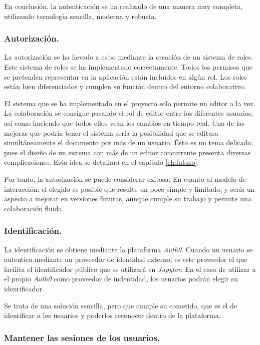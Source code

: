 \documentclass[11pt,spanish,listoffigures]{tfgetsinf}
\begin{document}
En conclusión, la autenticación se ha realizado de una manera muy completa, utilizando tecnología sencilla, moderna y robusta.

\subsubsection{Autorización.}

La autorización se ha llevado a cabo mediante la creación de un sistema de roles. Este sistema de roles se ha implementado correctamente. Todos los permisos que se pretenden representar en la aplicación están incluídos en algún rol. Los roles están bien diferenciados y cumplen su función dentro del entorno colaborativo. 

El sistema que se ha implementado en el proyecto solo permite un editor a la vez. La colaboración se consigue pasando el rol de editor entre los diferentes usuarios, así como haciendo que todos ellos vean los cambios en tiempo real. Una de las mejoras que podría tener el sistema sería la posibilidad que se editara simultáneamente el documento por más de un usuario. Ésto es un tema delicado, pues el diseño de un sistema con más de un editor concurrente presenta diversas complicaciones. Esta idea se detallará en el capítulo \ref{ch:futuro}.

Por tanto, la autorización se puede considerar exitosa. En cuanto al modelo de interacción, el elegido es posible que resulte un poco simple y limitado, y sería un aspecto a mejorar en versiones futuras, aunque cumple su trabajo y permite una colaboración fluida. 

\subsubsection{Identificación.}

La identificación se obtiene mediante la plataforma \textit{Auth0}. Cuando un usuario se autentica mediante un proveedor de identidad externo, es este proveedor el que facilita el identificador público que se utilizará en \textit{Jupyter}. En el caso de utilizar a el propio \textit{Auth0} como proveedor de indentidad, los usuarios podrán elegir su identificador. 

Se trata de una solución sencilla, pero que cumple su cometido, que es el de identificar a los usuarios y poderlos reconocer dentro de la plataforma.

\subsubsection{Mantener las sesiones de los usuarios.}
\label{subsec:objetivos-conc-session}
\end{document}
